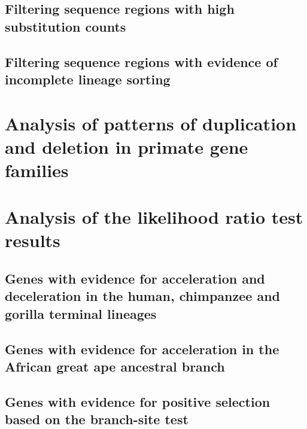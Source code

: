 \subsection{Filtering sequence regions with high substitution counts}
\subsection{Filtering sequence regions with evidence of incomplete lineage sorting}
\section{Analysis of patterns of duplication and deletion in primate gene families}
\section{Analysis of the likelihood ratio test results}
\subsection{Genes with evidence for acceleration and deceleration in the human, chimpanzee and gorilla terminal lineages}
\subsection{Genes with evidence for acceleration in the African great ape ancestral branch}
\subsection{Genes with evidence for positive selection based on the branch-site test}
